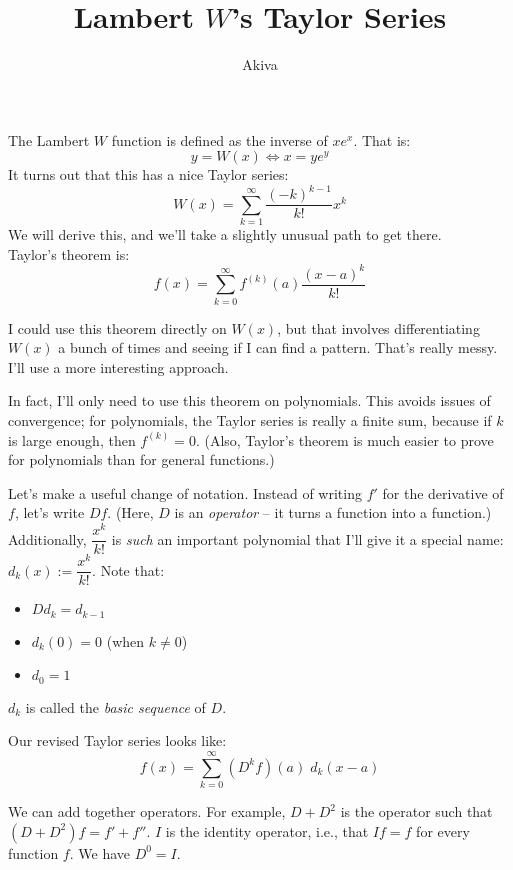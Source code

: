 \documentclass[11pt, oneside]{article}   	%
\title{Lambert $W$'s Taylor Series}
\author{Akiva}
\date{}							%
\begin{document}
\maketitle
The Lambert $W$ function is defined as the inverse of $xe^x$. That is:
$$y=W(x)\iff x=ye^y$$
It turns out that this has a nice Taylor series:
$$W(x)=\sum_{k=1}^\infty\frac{(-k)^{k-1}}{k!}x^k$$
We will derive this, and we'll take a slightly unusual path to get there.\\

Taylor's theorem is:
$$f(x)=\sum_{k=0}^\infty f^{(k)}(a)\frac{(x-a)^k}{k!}$$

I could use this theorem directly on $W(x)$, but that involves differentiating $W(x)$ a bunch of times and seeing if I can find a pattern. That's really messy. I'll use a more interesting approach.

In fact, I'll only need to use this theorem on polynomials. This avoids issues of convergence; for polynomials, the Taylor series is really a finite sum, because if $k$ is large enough, then $f^{(k)}=0$. (Also, Taylor's theorem is much easier to prove for polynomials than for general functions.)

Let's make a useful change of notation. Instead of writing $f'$ for the derivative of $f$, let's write $Df$. (Here, $D$ is an \textit{operator} -- it turns a function into a function.) Additionally, $\dfrac{x^k}{k!}$ is \textit{such} an important polynomial that I'll give it a special name: $d_k(x):=\dfrac{x^k}{k!}$. Note that:
\begin{itemize}
\item $Dd_k=d_{k-1}$
\item $d_k(0)=0$ (when $k\ne0$)
\item $d_0=1$
\end{itemize}
$d_k$ is called the \textit{basic sequence} of $D$.

Our revised Taylor series looks like:
$$f(x)=\sum_{k=0}^\infty (D^kf)(a)\;d_k(x-a)$$

We can add together operators. For example, $D+D^2$ is the operator such that $(D+D^2)f=f'+f''$. $I$ is the identity operator, i.e., that $If=f$ for every function $f$. We have $D^0=I$.
\end{document}
